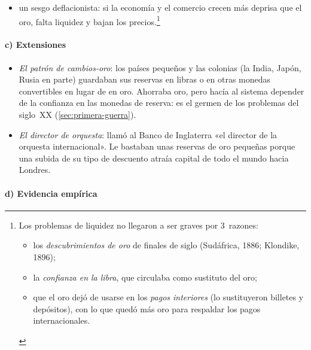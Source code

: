\documentclass[11pt]{article}
\begin{document}
\begin{itemize}
\begin{itemize}
  \item un sesgo deflacionista: si la economía y el comercio crecen más deprisa que el oro, falta liquidez y bajan los precios.\footnote{Los problemas de liquidez no llegaron a ser graves por 3~razones:
\begin{itemize}
\item los \emph{descubrimientos de oro} de finales de siglo (Sudáfrica, 1886; Klondike, 1896);
\item la \emph{confianza en la libra}, que circulaba como sustituto del oro;
\item que el oro dejó de usarse en los \emph{pagos interiores} (lo sustituyeron billetes y depósitos), con lo que quedó más oro para respaldar los pagos internacionales.
\end{itemize}}
  \end{itemize}
\end{itemize}

\paragraph{c) Extensiones}

\begin{itemize}
\item \emph{El patrón de cambios-oro}: los países pequeños y las colonias (la India, Japón, Rusia en parte) guardaban sus reservas en libras o en otras monedas convertibles en lugar de en oro. Ahorraba oro, pero hacía al sistema depender de la confianza en las monedas de reserva: es el germen de los problemas del siglo~XX (\ref{sec:primera-guerra}).
\item \emph{El director de orquesta}:  llamó al Banco de Inglaterra «el director de la orquesta internacional»\nocite{Keynes1930Treatise}. Le bastaban unas reservas de oro pequeñas porque una subida de su tipo de descuento atraía capital de todo el mundo hacia Londres.
\end{itemize}

\paragraph{d) Evidencia empírica}
\end{document}
